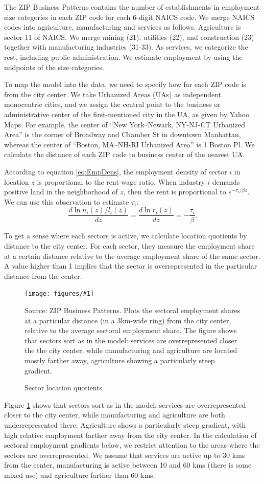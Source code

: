 \documentclass[12pt]{article}
\newcommand{\dofigure}[3]{\begin{figure}
\begin{centering}
\texttt{[image: figures/\#1]}
  \caption{#2\label{fig:#1}}
\end{centering}

\noindent \footnotesize{#3}
\end{figure}}
\begin{document}
The ZIP Business Patterns contains the number of establishments in employment size categories in each ZIP code for each 6-digit NAICS code. We merge NAICS codes into agriculture, manufacturing and services as follows. Agriculture is sector 11 of NAICS. We merge mining (21), utilities (22), and construction (23) together with manufacturing industries (31-33). As services, we categorize the rest, including public administration. We estimate employment by using the midpoints of the size categories.

To map the model into the data, we need to specify how far each ZIP code is from the city center. We take Urbanized Areas (UAs) as independent monocentric cities, and we assign the central point to the business or administrative center of the first-mentioned city in the UA, as given by Yahoo Maps. For example, the center of ``New York–Newark, NY-NJ-CT Urbanized Area'' is the corner of Broadway and Chamber St in downtown Manhattan, whereas the center of ``Boston, MA–NH-RI Urbanized Area'' is 1 Boston Pl. We calculate the distance of each ZIP code to business center of the nearest UA.

According to equation \ref{eq:EmpDens}, the employment density of sector $i$ in location $z$ is proportional to the rent-wage ratio. When industry $i$ demands positive land in the neighborhood of $z$, then the rent is proportional to $e^{-\tau_i/\beta z}$. We can use this observation to estimate $\tau_i$:
\[
\frac{d\ln n_i(z)/l_i(z)}{dz} =\frac{d\ln r_i(z)}{dz} = -\frac{\tau_i}{\beta}.
\]

To get a sense where each sectors is active, we calculate location quotients by distance to the city center. For each sector, they measure the employment share at a certain distance relative to the average employment share of the same sector. A value higher than 1 implies that the sector is overrepresented in the particular distance from the center.

\dofigure{sector_location_quotients}{Sector location quotients}{Source: ZIP Business Patterns. Plots the sectoral employment shares at a particular distance (in a 3km-wide ring) from the city center, relative to the average sectoral employment share. The figure shows that sectors sort as in the model: services are overrepresented closer the the city center, while manufacturing and agriculture are located mostly farther away, agriculture showing a particularly steep gradient.}

Figure \ref{fig:sector_location_quotients} shows that sectors sort as in the model: services are overrepresented closer to the city center, while manufacturing and agriculture are both underrepresented there. Agriculture shows a particularly steep gradient, with high relative employment farther away from the city center. In the calculation of sectoral employment gradients below, we restrict attention to the areas where the sectors are overrepresented. We assume that services are active up to 30 kms from the center, manufacturing is active between 10 and 60 kms (there is some mixed use) and agriculture farther than 60 kms.
\end{document}
